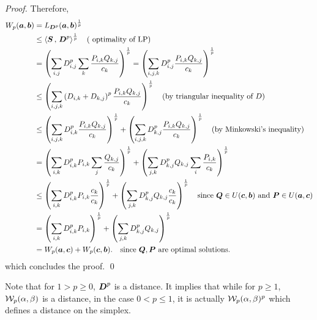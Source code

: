 \documentclass[11pt]{article}
\begin{document}
\begin{proof}
Therefore, 
\begin{align*}
W_{p}(\boldsymbol{a}, \boldsymbol{b}) &= L_{\boldsymbol{D}^{p}}(\boldsymbol{a}, \boldsymbol{b})^{\frac{1}{p}} \\
& \le \left\langle \boldsymbol{S}\,,\, \boldsymbol{D}^{p} \right\rangle^{\frac{1}{p}} \quad (\text{ optimality of LP}) \\
& =  \left(\sum_{i,j}D^{p}_{i,j} \sum_{k} \frac{P_{i,k}Q_{k,j}}{c_{k}} \right)^{\frac{1}{p}}  =  \left(\sum_{i,j,k}D^{p}_{i,j}\frac{P_{i,k}Q_{k,j}}{c_{k}} \right)^{\frac{1}{p}}\\
&\le  \left(\sum_{i,j,k}\left(D_{i,k} + D_{k,j}\right)^{p}\frac{P_{i,k}Q_{k,j}}{c_{k}} \right)^{\frac{1}{p}} \quad (\text{by triangular inequality of }D)\\
&\le  \left(\sum_{i,j,k}D_{i,k}^{p}\frac{P_{i,k}Q_{k,j}}{c_{k}} \right)^{\frac{1}{p}} + \left(\sum_{i,j,k}D_{k,j}^{p}\frac{P_{i,k}Q_{k,j}}{c_{k}} \right)^{\frac{1}{p}}  \quad (\text{by  Minkowski's inequality)} \\
&=  \left(\sum_{i,k}D_{i,k}^{p}P_{i,k}\sum_{j}\frac{Q_{k,j}}{c_{k}} \right)^{\frac{1}{p}} + \left(\sum_{j,k}D_{k,j}^{p}Q_{k,j}\sum_{i}\frac{P_{i,k}}{c_{k}} \right)^{\frac{1}{p}} \\
&\le  \left(\sum_{i,k}D_{i,k}^{p}P_{i,k}\frac{c_{k}}{c_{k}} \right)^{\frac{1}{p}} + \left(\sum_{j,k}D_{k,j}^{p}Q_{k,j}\frac{c_{k}}{c_{k}} \right)^{\frac{1}{p}}   \quad \text{since }\boldsymbol{Q} \in U(\boldsymbol{c}, \boldsymbol{b})\text{ and }\boldsymbol{P} \in U(\boldsymbol{a}, \boldsymbol{c}) \\
&= \left(\sum_{i,k}D_{i,k}^{p}P_{i,k}\right)^{\frac{1}{p}} + \left(\sum_{j,k}D_{k,j}^{p}Q_{k,j}\right)^{\frac{1}{p}} \\
& = W_{p}(\boldsymbol{a}, \boldsymbol{c}) + W_{p}(\boldsymbol{c}, \boldsymbol{b}). \quad \text{since }\boldsymbol{Q},\boldsymbol{P}\text{ are optimal solutions.}
\end{align*} which concludes the proof. \qed
\end{proof}
Note  that for $1> p\ge 0$, $\boldsymbol{D}^{p}$ is a distance. It implies that while for $p \ge 1$, ${\mathcal W}_p(\alpha, \beta)$ is a distance, in the case $0 < p \le 1$, it is actually
${\mathcal W}_p(\alpha, \beta)^p$ which defines a distance on the simplex.
\end{document}
